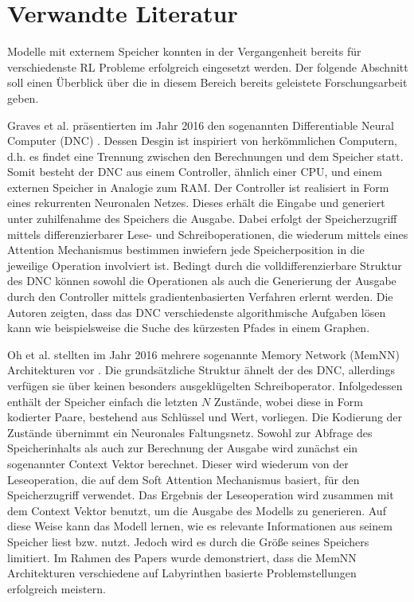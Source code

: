 \chapter{Verwandte Literatur}

Modelle mit externem Speicher konnten in der Vergangenheit bereits für verschiedenste RL Probleme erfolgreich eingesetzt werden. Der folgende Abschnitt soll einen Überblick über die in diesem Bereich bereits geleistete Forschungsarbeit geben.

Graves et al. präsentierten im Jahr 2016 den sogenannten Differentiable Neural Computer (DNC) \cite{DNC}. Dessen Desgin ist inspiriert von herkömmlichen Computern, d.h. es findet eine Trennung zwischen den Berechnungen und dem Speicher statt. Somit besteht der DNC aus einem Controller, ähnlich einer CPU, und einem externen Speicher in Analogie zum RAM. Der Controller ist realisiert in Form eines rekurrenten Neuronalen Netzes. Dieses erhält die Eingabe und generiert unter zuhilfenahme des Speichers die Ausgabe. Dabei erfolgt der Speicherzugriff mittels differenzierbarer Lese- und Schreiboperationen, die wiederum mittels eines Attention Mechanismus bestimmen inwiefern jede Speicherposition in die jeweilige Operation involviert ist. Bedingt durch die volldifferenzierbare Struktur des DNC können sowohl die Operationen als auch die Generierung der Ausgabe durch den Controller mittels gradientenbasierten Verfahren erlernt werden. Die Autoren zeigten, dass das DNC verschiedenste algorithmische Aufgaben lösen kann wie beispielsweise die Suche des kürzesten Pfades in einem Graphen.

Oh et al. stellten im Jahr 2016 mehrere sogenannte Memory Network (MemNN) Architekturen vor \cite{MemNN}. Die grundsätzliche Struktur ähnelt der des DNC, allerdings verfügen sie über keinen besonders ausgeklügelten Schreiboperator. Infolgedessen enthält der Speicher einfach die letzten $N$ Zustände, wobei diese in Form kodierter Paare, bestehend aus Schlüssel und Wert, vorliegen. Die Kodierung der Zustände übernimmt ein Neuronales Faltungsnetz. Sowohl zur Abfrage des Speicherinhalts als auch zur Berechnung der Ausgabe wird zunächst ein sogenannter Context Vektor berechnet. Dieser wird wiederum von der Leseoperation, die auf dem Soft Attention Mechanismus basiert, für den Speicherzugriff verwendet. Das Ergebnis der Leseoperation wird zusammen mit dem Context Vektor benutzt, um die Ausgabe des Modells zu generieren. Auf diese Weise kann das Modell lernen, wie es relevante Informationen aus seinem Speicher liest bzw. nutzt. Jedoch wird es durch die Größe seines Speichers limitiert. Im Rahmen des Papers wurde demonstriert, dass die MemNN Architekturen verschiedene auf Labyrinthen basierte Problemstellungen erfolgreich meistern.

